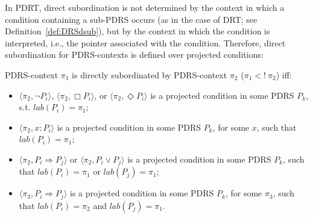 \noindent In PDRT, direct subordination is not determined by the context in
which a condition containing a sub-PDRS occurs (as in the case of DRT; see
Definition~\ref{def:DRSdsub}), but by the context in which the condition is
interpreted, i.e., the pointer associated with the condition. Therefore,
direct subordination for PDRS-contexts is defined over projected conditions:

\begin{subdefinition}\label{def:PDRSdsub}
PDRS-context $\pi_1$ is directly subordinated by PDRS-context $\pi_2$ 
($\pi_1 <!~\pi_2$) iff:
  \begin{itemize}
    \item $\langle\pi_2,\neg P_i\rangle$,
      $\langle\pi_2,\Box P_i\rangle$,
      or $\langle\pi_2,\Diamond P_i\rangle$ is a projected condition in
      some PDRS $P_k$, s.t. $lab(P_i) = \pi_1$;
    \item $\langle\pi_2,x:P_i\rangle$ is a projected condition in some
      PDRS $P_k$, for some $x$, such that $lab(P_i) = \pi_1$;
    \item  $\langle\pi_2,P_i \Rightarrow P_j\rangle$ or
      $\langle\pi_2,P_i \vee P_j\rangle$ is a projected condition in
      some PDRS $P_k$, such that $lab(P_i) = \pi_1$ or $lab(P_j) = \pi_1$;
    \item $\langle \pi_3, P_i \Rightarrow P_j \rangle$ is a projected condition
      in some PDRS $P_k$, for some $\pi_3$, such that $lab(P_i) = \pi_2$ and 
      $lab(P_j) = \pi_1$.
  \end{itemize}
\end{subdefinition}


